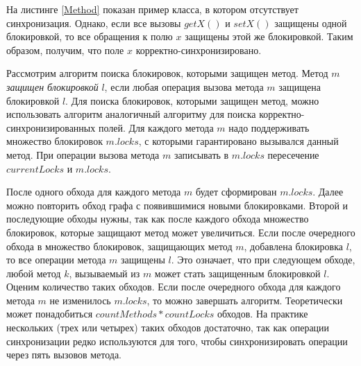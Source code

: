 На листинге \ref{Method} показан пример класса, в котором отсутствует синхронизация. Однако, если все вызовы $getX()$ и $setX()$ защищены одной блокировкой, то все обращения к полю $x$ защищены этой же блокировкой. Таким образом, получим, что поле $x$ корректно-синхронизировано.

Рассмотрим алгоритм поиска блокировок, которыми защищен метод. Метод $m$ \emph{защищен блокировкой} $l$, если любая операция вызова метода $m$ защищена блокировкой $l$. Для поиска блокировок, которыми защищен метод, можно использовать алгоритм аналогичный алгоритму для поиска корректно-синхронизированных полей. Для каждого метода $m$ надо поддерживать множество блокировок $m.locks$, с которыми гарантировано вызывался данный метод. При операции вызова метода $m$ записывать в $m.locks$ пересечение $currentLocks$ и $m.locks$.

После одного обхода для каждого метода $m$ будет сформирован $m.locks$. Далее можно повторить обход графа с появившимися новыми блокировками. Второй и последующие обходы нужны, так как после каждого обхода множество блокировок, которые защищают метод может увеличиться. Если после очередного обхода в множество блокировок, защищающих метод $m$, добавлена блокировка $l$, то все операции метода $m$ защищены $l$. Это означает, что при следующем обходе, любой метод $k$, вызываемый из $m$ может стать защищенным блокировкой $l$. Оценим количество таких обходов. Если после очередного обхода для каждого метода $m$ не изменилось $m.locks$, то можно завершать алгоритм. Теоретически может понадобиться $countMethods * countLocks$ обходов. На практике нескольких (трех или четырех) таких обходов достаточно, так как операции синхронизации редко используются для того, чтобы синхронизировать операции через пять вызовов метода.
\FloatBarrier
